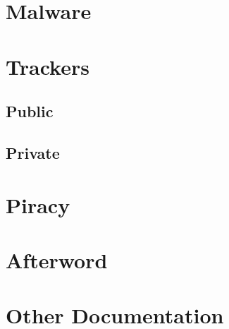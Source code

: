 \documentclass{article}
\begin{document}
\section{Malware}
\section{Trackers}
	\subsection{Public}
	\subsection{Private}
\section{Piracy}
\section{Afterword}
\section{Other Documentation}
\end{document}
